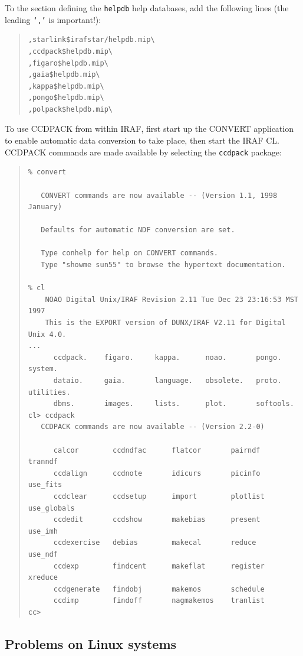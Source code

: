 \documentclass[twoside,11pt]{article}
\newcommand{\xlabel}[1]{}
\renewcommand{\_}{\texttt{\symbol{95}}}
\newcommand{\latexonlysmall}{\small}
\newcommand{\latexonlysmall}{}
\begin{document}
To the section defining the \texttt{helpdb} help databases, add the
following lines (the leading \texttt{`,'} is important!):

\begin{quote}
\begin{verbatim}
,starlink$irafstar/helpdb.mip\
,ccdpack$helpdb.mip\
,figaro$helpdb.mip\
,gaia$helpdb.mip\
,kappa$helpdb.mip\
,pongo$helpdb.mip\
,polpack$helpdb.mip\
\end{verbatim}
\end{quote}

To use CCDPACK from within IRAF, first start up the CONVERT application to
enable automatic data conversion to take place, then start the IRAF
CL\@.  CCDPACK commands are made available by selecting the
\texttt{ccdpack} package:

\begin{quote}
\latexonlysmall
\begin{verbatim}
% convert
 
   CONVERT commands are now available -- (Version 1.1, 1998 January)
 
   Defaults for automatic NDF conversion are set.
 
   Type conhelp for help on CONVERT commands.
   Type "showme sun55" to browse the hypertext documentation.

% cl
    NOAO Digital Unix/IRAF Revision 2.11 Tue Dec 23 23:16:53 MST 1997
    This is the EXPORT version of DUNX/IRAF V2.11 for Digital Unix 4.0.
... 
      ccdpack.    figaro.     kappa.      noao.       pongo.      system.
      dataio.     gaia.       language.   obsolete.   proto.      utilities.
      dbms.       images.     lists.      plot.       softools.   
cl> ccdpack
   CCDPACK commands are now available -- (Version 2.2-0)
 
      calcor        ccdndfac      flatcor       pairndf       tranndf
      ccdalign      ccdnote       idicurs       picinfo       use_fits
      ccdclear      ccdsetup      import        plotlist      use_globals
      ccdedit       ccdshow       makebias      present       use_imh
      ccdexercise   debias        makecal       reduce        use_ndf
      ccdexp        findcent      makeflat      register      xreduce
      ccdgenerate   findobj       makemos       schedule      
      ccdimp        findoff       nagmakemos    tranlist
cc> 
\end{verbatim}
\normalsize
\end{quote}

\subsection{\xlabel{problems_on_linux_systems}Problems on Linux systems}
\label{problems_on_linux_systems}
\end{document}
